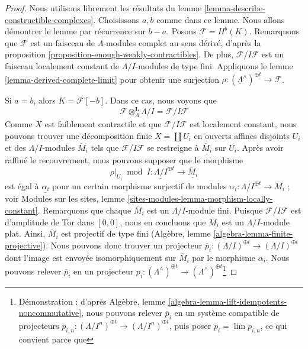 \begin{proof}
Nous utilisons librement les résultats du
lemme \ref{lemma-describe-constructible-complexes}.
Choisissons $a, b$ comme dans ce lemme. Nous allons démontrer le lemme par
récurrence sur $b - a$. Posons $\mathcal{F} = H^b(K)$.
Remarquons que $\mathcal{F}$ est un faisceau de
$\Lambda$-modules complet au sens dérivé, d'après la
proposition \ref{proposition-enough-weakly-contractibles}.
De plus, $\mathcal{F}/I\mathcal{F}$ est un faisceau localement
constant de $\Lambda/I$-modules de type fini.
Appliquons le lemme \ref{lemma-derived-complete-limit} pour obtenir une surjection
$\rho : (\underline{\Lambda}^\wedge)^{\oplus t} \to \mathcal{F}$.

\medskip\noindent
Si $a = b$, alors $K = \mathcal{F}[-b]$. Dans ce cas, nous voyons que
$$
\mathcal{F} \otimes_\Lambda^\mathbf{L} \underline{\Lambda/I} =
\mathcal{F}/I\mathcal{F}
$$
Comme $X$ est faiblement contractile et que $\mathcal{F}/I\mathcal{F}$ est
localement constant, nous pouvons trouver une décomposition finie
$X = \coprod U_i$ en ouverts affines disjoints $U_i$
et des $\Lambda/I$-modules $\overline{M}_i$
tels que $\mathcal{F}/I\mathcal{F}$ se restreigne à
$\underline{\overline{M}_i}$ sur $U_i$. Après avoir raffiné le recouvrement,
nous pouvons supposer que le morphisme
$$
\rho|_{U_i} \bmod I :
\underline{\Lambda/I}^{\oplus t}
\longrightarrow
\underline{\overline{M}_i}
$$
est égal à $\underline{\alpha_i}$ pour un certain morphisme surjectif de modules
$\alpha_i : \Lambda/I^{\oplus t} \to \overline{M}_i$ ; voir
Modules sur les sites, lemme \ref{sites-modules-lemma-morphism-locally-constant}.
Remarquons que chaque $\overline{M}_i$ est un $\Lambda/I$-module fini.
Puisque $\mathcal{F}/I\mathcal{F}$ est d'amplitude de Tor dans $[0, 0]$,
nous en concluons que $\overline{M}_i$ est un $\Lambda/I$-module plat.
Ainsi, $\overline{M}_i$ est projectif de type fini
(Algèbre, lemme \ref{algebra-lemma-finite-projective}).
Nous pouvons donc trouver un projecteur
$\overline{p}_i : (\Lambda/I)^{\oplus t} \to (\Lambda/I)^{\oplus t}$
dont l'image est envoyée isomorphiquement sur $\overline{M}_i$ par le morphisme $\alpha_i$.
Nous pouvons relever $\overline{p}_i$ en un projecteur
$p_i : (\Lambda^\wedge)^{\oplus t} \to
(\Lambda^\wedge)^{\oplus t}$\footnote{Démonstration : d'après
Algèbre, lemme \ref{algebra-lemma-lift-idempotents-noncommutative},
nous pouvons relever $\overline{p}_i$ en un système compatible de
projecteurs $p_{i, n} : (\Lambda/I^n)^{\oplus t} \to (\Lambda/I^n)^{\oplus t}$,
puis poser $p_i = \lim p_{i, n}$, ce qui convient parce que
}
\end{proof}
